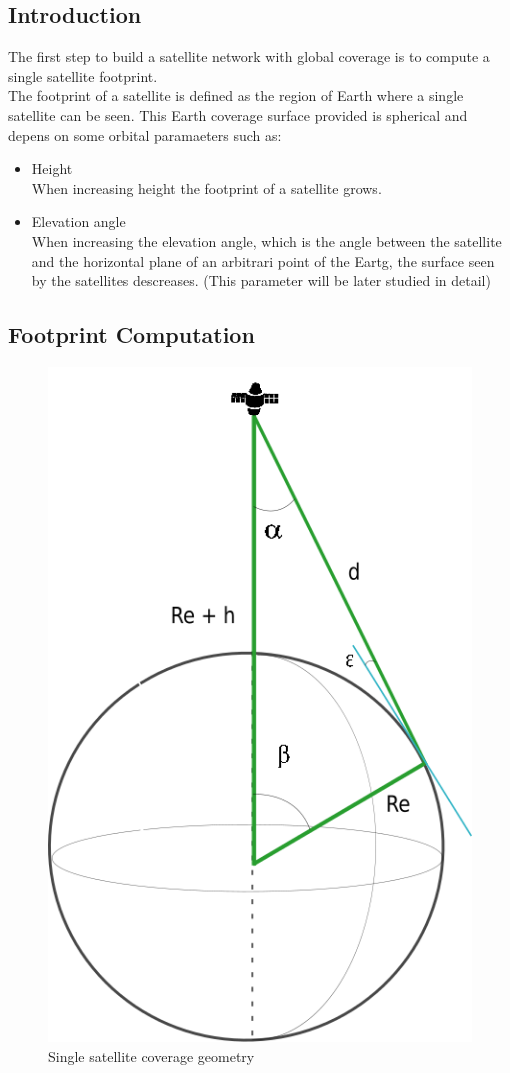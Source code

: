 

\subsection{Introduction}

The first step to build a satellite network with global coverage is to compute a single satellite footprint.\\

The footprint of a satellite is defined as the region of Earth where a single satellite can be seen. This Earth coverage surface provided is spherical and depens on some orbital paramaeters such as:

\begin{itemize}
\item Height \\
When increasing height the footprint of a satellite grows.
\item Elevation angle \\
When increasing the elevation angle, which is the angle between the satellite and the horizontal plane of an arbitrari point of the Eartg, the surface seen by the satellites descreases. (This parameter will be later studied in detail)
\end{itemize}

\subsection{Footprint Computation}
 
\begin{figure}[H] %

	\centering
	\includegraphics[width=.3\textwidth]{./fig-Ch2-OrbitalCoverage/AngleSSatFoot.png}
	\caption{Single satellite coverage geometry}
	\label{fig:AngleSSatFoot}
	
\end{figure}

